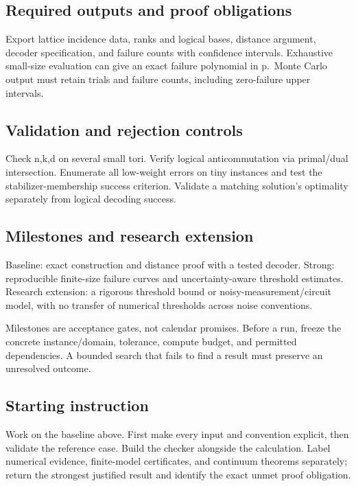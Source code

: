\documentclass[
  11pt,
]{article}
\begin{document}
\subsection{Required outputs and proof obligations}

Export lattice incidence data, ranks and logical bases, distance
argument, decoder specification, and failure counts with confidence
intervals. Exhaustive small-size evaluation can give an exact failure
polynomial in p.~Monte Carlo output must retain trials and failure
counts, including zero-failure upper intervals.

\subsection{Validation and rejection controls}

Check n,k,d on several small tori. Verify logical anticommutation via
primal/dual intersection. Enumerate all low-weight errors on tiny
instances and test the stabilizer-membership success criterion. Validate
a matching solution's optimality separately from logical decoding
success.

\subsection{Milestones and research extension}

Baseline: exact construction and distance proof with a tested decoder.
Strong: reproducible finite-size failure curves and uncertainty-aware
threshold estimates. Research extension: a rigorous threshold bound or
noisy-measurement/circuit model, with no transfer of numerical
thresholds across noise conventions.

Milestones are acceptance gates, not calendar promises. Before a run,
freeze the concrete instance/domain, tolerance, compute budget, and
permitted dependencies. A bounded search that fails to find a result
must preserve an unresolved outcome.

\subsection{Starting instruction}

Work on the baseline above. First make every input and convention
explicit, then validate the reference case. Build the checker alongside
the calculation. Label numerical evidence, finite-model certificates,
and continuum theorems separately; return the strongest justified result
and identify the exact unmet proof obligation.
\end{document}
